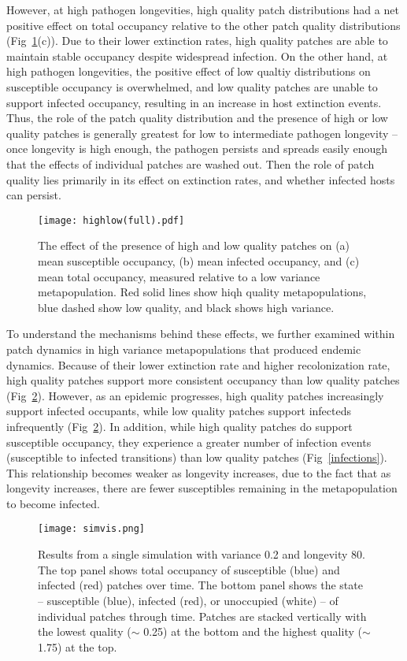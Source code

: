 \documentclass{svjour3}
\begin{document}
However, at high pathogen longevities, high quality patch distributions had a net positive effect on total occupancy relative to the other patch quality distributions (Fig~\ref{sens}(c)).  Due to their lower extinction rates, high quality patches are able to maintain stable occupancy despite widespread infection.  On the other hand, at high pathogen longevities, the positive effect of low qualtiy distributions on susceptible occupancy is overwhelmed, and low quality patches are unable to support infected occupancy, resulting in an increase in host extinction events.  Thus, the role of the patch quality distribution and the presence of high or low quality patches is generally greatest for low to intermediate pathogen longevity -- once longevity is high enough, the pathogen persists and spreads easily enough that the effects of individual patches are washed out.  Then the role of patch quality lies primarily in its effect on extinction rates, and whether infected hosts can persist.

\begin{figure}
\centering
\texttt{[image: highlow(full).pdf]}
\caption{The effect of the presence of high and low quality patches on (a) mean susceptible occupancy, (b) mean infected occupancy, and (c) mean total occupancy, measured relative to  a low variance metapopulation.  Red solid lines show hiqh quality metapopulations, blue dashed show low quality, and black shows high variance.}
\label{sens}
\end{figure}

To understand the mechanisms behind these effects, we further examined within patch dynamics in high variance metapopulations that produced endemic dynamics.  Because of their lower extinction rate and higher recolonization rate, high quality patches support more consistent occupancy than low quality patches (Fig~\ref{simvis}).  However, as an epidemic progresses, high quality patches increasingly support infected occupants, while low quality patches support infecteds infrequently (Fig~\ref{simvis}).  In addition, while high quality patches do support susceptible occupancy, they experience a greater number of infection events (susceptible to infected transitions) than low quality patches (Fig~\ref{infections}).  This relationship becomes weaker as longevity increases, due to the fact that as longevity increases, there are fewer susceptibles remaining in the metapopulation to become infected.  

\begin{figure}
\centering
\texttt{[image: simvis.png]}
\caption{Results from a single simulation with variance 0.2 and longevity 80.  The top panel shows total occupancy of susceptible (blue) and infected (red) patches over time.  The bottom panel shows the state -- susceptible (blue), infected (red), or unoccupied (white) -- of individual patches through time.  Patches are stacked vertically with the lowest quality ($\sim$ 0.25) at the bottom and the highest quality ($\sim$ 1.75) at the top.}
\label{simvis}
\end{figure}
\end{document}
